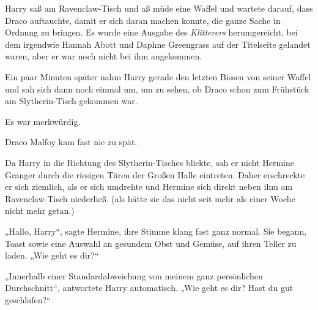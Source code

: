 Harry saß am Ravenclaw-Tisch und aß müde eine Waffel und wartete darauf, dass Draco auftauchte, damit er sich daran machen konnte, die ganze Sache in Ordnung zu bringen. Es wurde eine Ausgabe des \emph{Klitterers} herumgereicht, bei dem irgendwie Hannah Abott und Daphne Greengrass auf der Titelseite gelandet waren, aber er war noch nicht bei ihm angekommen.

Ein paar Minuten später nahm Harry gerade den letzten Bissen von seiner Waffel und sah sich dann noch einmal um, um zu sehen, ob Draco schon zum Frühstück am Slytherin-Tisch gekommen war.

Es war merkwürdig.

Draco Malfoy kam fast nie zu spät.

Da Harry in die Richtung des Slytherin-Tisches blickte, sah er nicht Hermine Granger durch die riesigen Türen der Großen Halle eintreten. Daher erschreckte er sich ziemlich, als er sich umdrehte und Hermine sich direkt neben ihm am Ravenclaw-Tisch niederließ. (als hätte sie das nicht seit mehr als einer Woche nicht mehr getan.)

„Hallo, Harry“, sagte Hermine, ihre Stimme klang fast ganz normal. Sie begann, Toast sowie eine Auswahl an gesundem Obst und Gemüse, auf ihren Teller zu laden.
„Wie geht es dir?“

„Innerhalb einer Standardabweichung von meinem ganz persönlichen Durchschnitt“, antwortete Harry automatisch.
„Wie geht es dir? Hast du gut geschlafen?“

